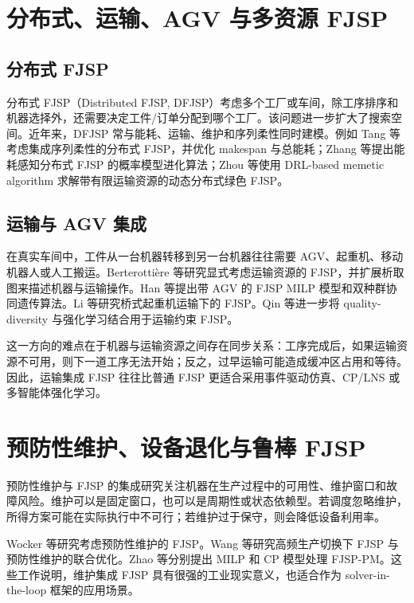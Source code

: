 \documentclass[UTF8,a4paper,11pt]{ctexart}
\begin{document}
\section{分布式、运输、AGV 与多资源 FJSP}

\subsection{分布式 FJSP}

分布式 FJSP（Distributed FJSP, DFJSP）考虑多个工厂或车间，除工序排序和机器选择外，还需要决定工件/订单分配到哪个工厂。该问题进一步扩大了搜索空间。近年来，DFJSP 常与能耗、运输、维护和序列柔性同时建模。例如 Tang 等考虑集成序列柔性的分布式 FJSP，并优化 makespan 与总能耗\cite{Tang2024DFJSP}；Zhang 等提出能耗感知分布式 FJSP 的概率模型进化算法\cite{Zhang2024ProbModel}；Zhou 等使用 DRL-based memetic algorithm 求解带有限运输资源的动态分布式绿色 FJSP\cite{Zhou2025DRLMA}。

\subsection{运输与 AGV 集成}

在真实车间中，工件从一台机器转移到另一台机器往往需要 AGV、起重机、移动机器人或人工搬运。Berterotti\`ere 等研究显式考虑运输资源的 FJSP，并扩展析取图来描述机器与运输操作\cite{Berterottiere2024Transport}。Han 等提出带 AGV 的 FJSP MILP 模型和双种群协同遗传算法\cite{Han2024AGV}。Li 等研究桥式起重机运输下的 FJSP\cite{Li2022Crane}。Qin 等进一步将 quality-diversity 与强化学习结合用于运输约束 FJSP\cite{Qin2025QD,Qin2026QDReal}。

这一方向的难点在于机器与运输资源之间存在同步关系：工序完成后，如果运输资源不可用，则下一道工序无法开始；反之，过早运输可能造成缓冲区占用和等待。因此，运输集成 FJSP 往往比普通 FJSP 更适合采用事件驱动仿真、CP/LNS 或多智能体强化学习。

\section{预防性维护、设备退化与鲁棒 FJSP}

预防性维护与 FJSP 的集成研究关注机器在生产过程中的可用性、维护窗口和故障风险。维护可以是固定窗口，也可以是周期性或状态依赖型。若调度忽略维护，所得方案可能在实际执行中不可行；若维护过于保守，则会降低设备利用率。

Wocker 等研究考虑预防性维护的 FJSP\cite{Wocker2024PM}。Wang 等研究高频生产切换下 FJSP 与预防性维护的联合优化\cite{Wang2024PM}。Zhao 等分别提出 MILP 和 CP 模型处理 FJSP-PM\cite{Zhao2025MILPPM,Zhao2025CPPM}。这些工作说明，维护集成 FJSP 具有很强的工业现实意义，也适合作为 solver-in-the-loop 框架的应用场景。
\end{document}

